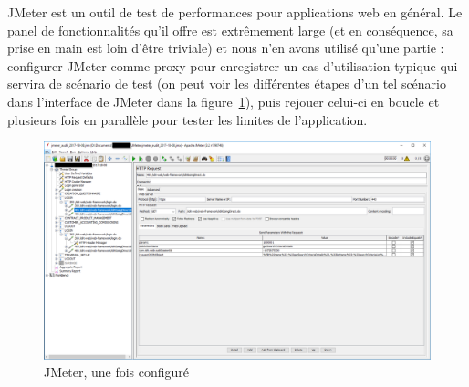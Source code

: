 JMeter\cite{jmeter} est un outil de test de performances pour applications web en général. Le panel de fonctionnalités qu'il offre est extrêmement large (et en conséquence, sa prise en main est loin d'être triviale) et nous n'en avons utilisé qu'une partie : configurer JMeter comme proxy pour enregistrer un cas d'utilisation typique qui servira de scénario de test (on peut voir les différentes étapes d'un tel scénario dans l'interface de JMeter dans la figure~\ref{fig:jmeter}), puis rejouer celui-ci en boucle et plusieurs fois en parallèle pour tester les limites de l'application.
\begin{figure}
  \includegraphics[width=\linewidth]{images/jmeter}
  \caption{JMeter, une fois configuré}
  \label{fig:jmeter}
\end{figure}


